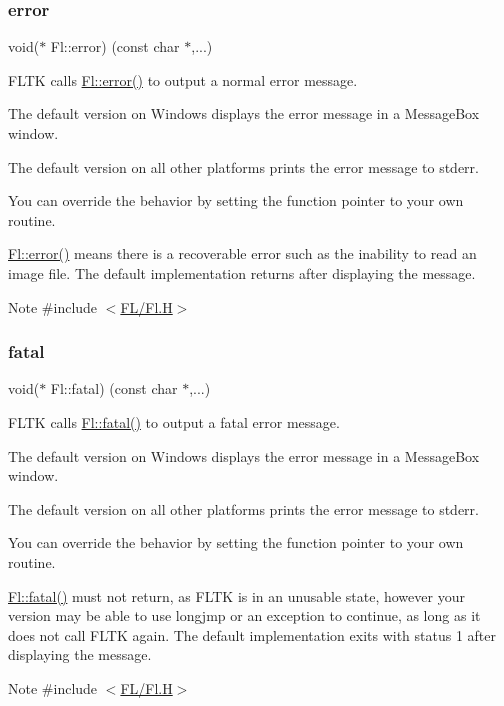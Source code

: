 \subsubsection{\texorpdfstring{error}{error}}
{\footnotesize\ttfamily void($\ast$ Fl\+::error) (const char $\ast$,...)\hspace{0.3cm}{\ttfamily [static]}}

F\+L\+TK calls \hyperlink{group__group__comdlg_ga9acd48aa40a8fb587f361a1f1907f207}{Fl\+::error()} to output a normal error message.

The default version on Windows displays the error message in a Message\+Box window.

The default version on all other platforms prints the error message to stderr.

You can override the behavior by setting the function pointer to your own routine.

\hyperlink{group__group__comdlg_ga9acd48aa40a8fb587f361a1f1907f207}{Fl\+::error()} means there is a recoverable error such as the inability to read an image file. The default implementation returns after displaying the message. \begin{DoxyNote}{Note}
\#include $<$\hyperlink{_fl_8_h}{F\+L/\+Fl.\+H}$>$ 
\end{DoxyNote}
\mbox{\label{group__group__comdlg_ga5f072307352192f9f7f8cff31c343526}} 
\subsubsection{\texorpdfstring{fatal}{fatal}}
{\footnotesize\ttfamily void($\ast$ Fl\+::fatal) (const char $\ast$,...)\hspace{0.3cm}{\ttfamily [static]}}

F\+L\+TK calls \hyperlink{group__group__comdlg_ga5f072307352192f9f7f8cff31c343526}{Fl\+::fatal()} to output a fatal error message.

The default version on Windows displays the error message in a Message\+Box window.

The default version on all other platforms prints the error message to stderr.

You can override the behavior by setting the function pointer to your own routine.

\hyperlink{group__group__comdlg_ga5f072307352192f9f7f8cff31c343526}{Fl\+::fatal()} must not return, as F\+L\+TK is in an unusable state, however your version may be able to use longjmp or an exception to continue, as long as it does not call F\+L\+TK again. The default implementation exits with status 1 after displaying the message. \begin{DoxyNote}{Note}
\#include $<$\hyperlink{_fl_8_h}{F\+L/\+Fl.\+H}$>$ 
\end{DoxyNote}
\mbox{\label{group__group__comdlg_ga915dadc35b73240c89b463a94c1e7d11}} 
